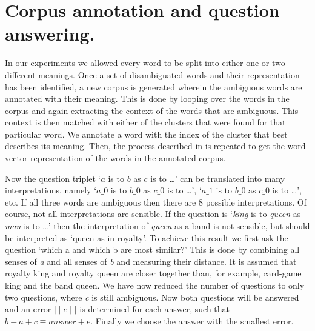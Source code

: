 \documentclass[11pt]{article}
\begin{document}
\section{Corpus annotation and question answering.}
In our experiments we allowed every word to be split into either one or two different meanings.
Once a set of disambiguated words and their representation has been identified, a new corpus is generated wherein the ambiguous words are annotated with their meaning. This is done by looping over the words in the corpus and again extracting the context of the words that are ambiguous. This context is then matched with either of the clusters that were found for that particular word. We annotate a word with the index of the cluster that best describes its meaning. Then, the process described in \cite{Mikolov:13} is repeated to get the word-vector representation of the words in the annotated corpus. 

Now the question triplet `$a$ is to $b$ as $c$ is to \dots' can be translated into many interpretations, namely `$a\_0$ is to $b\_0 $ as $c\_0 $ is to \dots', `$a\_1$ is to $b\_0 $ as $c\_0 $ is to \dots', etc. If all three words are ambiguous then there are 8 possible interpretations. Of course, not all interpretations are sensible. If the question is `\textit{king} is to \textit{queen} as \textit{man} is to \dots' then the interpretation of \textit{queen} as a band is not sensible, but should be interpreted as `queen as-in royalty'. To achieve this result we first ask the question `which a and which b are most similar?' This is done by combining all senses of \textit{a} and all senses of \textit{b} and measuring their distance. It is assumed that royalty king and royalty queen are closer together than, for example, card-game king and the band queen. We have now reduced the number of questions to only two questions, where \textit{c} is still ambiguous. Now both questions will be answered and an error $\mid\mid \textit{e} \mid\mid$ is determined for each answer, such that $\textit{b} - \textit{a} + \textit{c} \equiv \textit{answer} + \textit{e}$. Finally we choose the answer with the smallest error.

\end{document}
